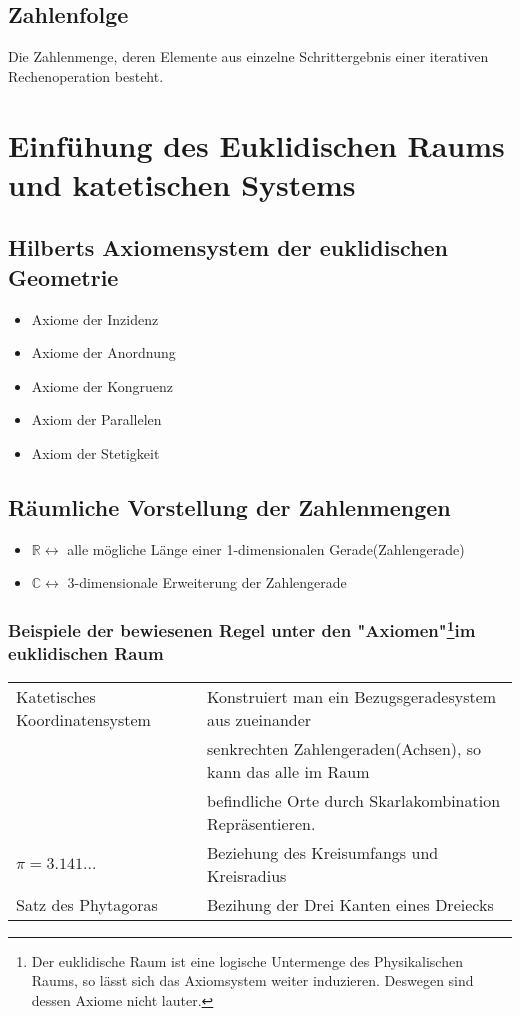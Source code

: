 \documentclass{article}
\begin{document}
    \subsection{Zahlenfolge}
    Die Zahlenmenge, deren Elemente aus einzelne Schrittergebnis einer iterativen Rechenoperation besteht.
    \pagebreak

    \section{Einfühung des Euklidischen Raums und katetischen Systems}
    \subsection{Hilberts Axiomensystem der euklidischen Geometrie}
    \begin{itemize}
        \item Axiome der Inzidenz
        \item Axiome der Anordnung
        \item Axiome der Kongruenz
        \item Axiom der Parallelen
        \item Axiom der Stetigkeit
    \end{itemize}
    \subsection{Räumliche Vorstellung der Zahlenmengen}
    \begin{itemize}
        \item $\mathbb{R}\leftrightarrow$ alle mögliche Länge einer 1-dimensionalen Gerade(Zahlengerade)
        \item $\mathbb{C}\leftrightarrow$ 3-dimensionale Erweiterung der Zahlengerade
    \end{itemize}
    \subsubsection[]{Beispiele der bewiesenen Regel unter den "Axiomen"\footnote{Der euklidische Raum ist eine logische Untermenge des Physikalischen Raums, so lässt sich das Axiomsystem weiter induzieren. Deswegen sind dessen Axiome nicht lauter.}im euklidischen Raum}
    \begin{tabular}{ll}
        Katetisches Koordinatensystem& Konstruiert man ein Bezugsgeradesystem aus zueinander\\& senkrechten Zahlengeraden(Achsen), so kann das alle im Raum\\& befindliche Orte  durch Skarlakombination Repräsentieren.\\
        $\pi=3.141\dots$ &Beziehung des Kreisumfangs und Kreisradius\\
        Satz des Phytagoras& Bezihung der Drei Kanten eines Dreiecks\\
    \end{tabular}
\end{document}
